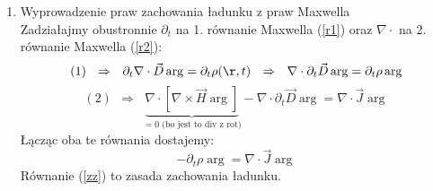\begin{enumerate}
\item{Wyprowadzenie praw zachowania ładunku z praw Maxwella}\\
Zadziałajmy obustronnie $\partial_t$ na 1. równanie Maxwella (\ref{r1}) oraz $\nabla\cdot$ na 2. równanie Maxwella (\ref{r2}):
\begin{equation}
(1)~~\Rightarrow ~~\partial_t \nabla\cdot \vec{D}\arg=\partial_t \rho(\r,t) ~~\Rightarrow~~ \nabla\cdot \partial_t\vec{D}\arg=\partial_t\rho\arg \end{equation}
 \begin{equation}
 (2)~~\Rightarrow~~ \underbrace{\nabla\cdot[\nabla\times\vec{H}\arg]}_{=0 \text{ (bo jest to div z rot)}}-\nabla\cdot\partial_t\vec{D}\arg=\nabla\cdot\vec{J}\arg
\end{equation}
Łącząc oba te równania dostajemy:
\begin{equation}
-\partial_t\rho\arg=\nabla\cdot\vec{J}\arg \label{zz}
\end{equation}
Równanie (\ref{zz}) to zasada zachowania ładunku.


\end{enumerate}
